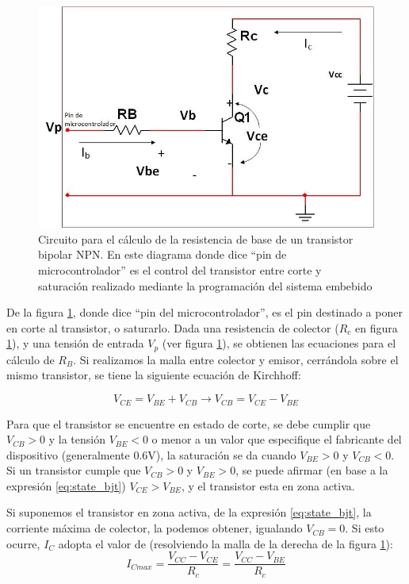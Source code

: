 \begin{figure}[ht!]
	\includegraphics[scale=0.8]{circuito_analisisBJT} 
	\caption{Circuito para el cálculo de la resistencia de base de un transistor bipolar NPN. En este diagrama donde dice ``pin de microcontrolador'' es el control del transistor entre corte y saturación realizado mediante la programación del sistema embebido}
	\label{fig:calc_RB}
\end{figure}


De la figura \ref{fig:calc_RB}, donde dice ``pin del microcontrolador'', es el pin destinado a poner en corte al transistor, o saturarlo. Dada una resistencia de colector ($R_c$ en figura \ref{fig:calc_RB}), y una tensión de entrada $V_p$ (ver figura \ref{fig:calc_RB}), se  obtienen las ecuaciones para el cálculo de $R_B$. 
Si realizamos la malla entre colector y emisor, cerrándola sobre el mismo transistor, se tiene la siguiente ecuación de Kirchhoff: 

\begin{equation} \label{eq:state_bjt}
	V_{CE} = V_{BE} + V_{CB} \rightarrow V_{CB}= V_{CE} - V_{BE}
\end{equation}

Para que el transistor se encuentre en estado de corte, se debe cumplir que $V_{CB}>0$  y la tensión $V_{BE}<0$ o menor a un valor que especifique el fabricante del dispositivo (generalmente 0.6V), la saturación se da cuando $V_{BE}>0$ y $V_{CB}<0$. Si un transistor cumple que $V_{CB}>0$ y $V_{BE}>0$, se puede afirmar (en base a la expresión \ref{eq:state_bjt}) $V_{CE}>V_{BE}$, y el transistor esta en zona activa.

Si suponemos el transistor en zona activa, de la expresión \ref{eq:state_bjt}, la corriente máxima de colector, la podemos obtener, igualando $V_{CB}=0$. Si esto ocurre, $I_C$  adopta el valor de (resolviendo la malla de la derecha de la figura \ref{fig:calc_RB}):
\begin{equation} \label{eq:ICmaxSat}
	I_{Cmax} = \frac{V_{CC} - V_{CE}}{R_c} = \frac{V_{CC} - V_{BE}}{R_c}
\end{equation} 

